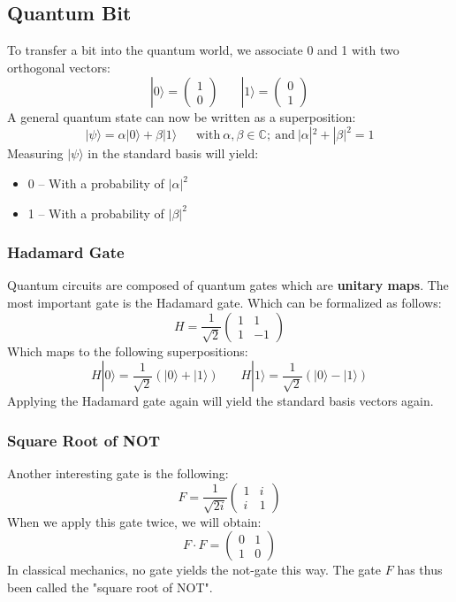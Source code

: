 \documentclass{article}
\begin{document}
\subsection{Quantum Bit}
To transfer a bit into the quantum world, we associate 0 and 1 with two orthogonal vectors:
\[ |0\rangle = \begin{pmatrix} 1 \\ 0 \end{pmatrix} ~~~~~~~~ |1\rangle = \begin{pmatrix} 0 \\ 1 \end{pmatrix} \]
A general quantum state can now be written as a superposition:
\[ |\psi\rangle = \alpha |0\rangle + \beta |1\rangle ~~~~~~~\text{with}~\alpha, \beta \in \mathbb{C};~\text{and}~|\alpha|^2 + |\beta|^2 = 1 \]
Measuring $|\psi\rangle$ in the standard basis will yield:

\begin{itemize}
	\item 0 -- With a probability of $|\alpha|^2$
	\item 1 -- With a probability of $|\beta|^2$
\end{itemize}

\subsubsection{Hadamard Gate}
Quantum circuits are composed of quantum gates which are \textbf{unitary maps}. The most important gate is the Hadamard gate. Which can be formalized as follows:
\[ H = \frac{1}{\sqrt{2}} \begin{pmatrix} 1 & 1 \\ 1 & -1 \end{pmatrix} \]
Which maps to the following superpositions:
\[ H|0\rangle = \frac{1}{\sqrt{2}}(|0\rangle + |1\rangle) ~~~~~~~~ H|1\rangle = \frac{1}{\sqrt{2}}(|0\rangle - |1\rangle) \]
Applying the Hadamard gate again will yield the standard basis vectors again.

\subsubsection{Square Root of NOT}
Another interesting gate is the following:
\[ F = \frac{1}{\sqrt{2i}} \begin{pmatrix} 1 & i \\ i & 1 \end{pmatrix} \]
When we apply this gate twice, we will obtain:
\[ F \cdot F = \begin{pmatrix} 0 & 1 \\ 1 & 0 \end{pmatrix} \]
In classical mechanics, no gate yields the not-gate this way. The gate $F$ has thus been called the "square root of NOT".
\end{document}
